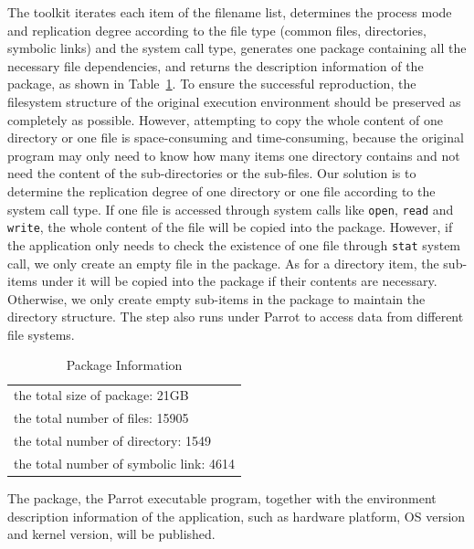 \documentclass{sig-alternate}
\begin{document}
The toolkit iterates each item of the filename list, determines the process
mode and replication degree according to the file type (common files,
directories, symbolic links) and the system call type, generates one package
containing all the necessary file dependencies, and returns the description
information of the package, as shown in Table~\ref{table:package-info}.  To
ensure the successful reproduction, the filesystem structure of the original
execution environment should be preserved as completely as possible. However,
attempting to copy the whole content of one directory or one file is
space-consuming and time-consuming, because the original program may 
only need to know how many items one directory contains and not need the content of the sub-directories or the sub-files.
Our solution is to
determine the replication degree of one directory or one file according to the
system call type. 
If one file is accessed through system calls like {\tt open}, {\tt read} and {\tt write}, the whole content of the file will be copied into the package.
However, if the application only needs to check the existence of one file through {\tt stat} system call, we only create an empty file in the package.
As for a directory item, the sub-items under it will be copied into the package if their contents are necessary. Otherwise, we only create empty sub-items in the package to maintain the directory structure.
The step also runs under Parrot to access data from
different file systems.

\begin{table}
    \centering
    \begin{tabular}{|l|}
    \hline
     the total size of package: 21GB \\ 
    the total number of files: 15905\\ 
    the total number of directory: 1549\\ 
    the total number of symbolic link: 4614 \\ \hline 
    \end{tabular}
    \caption{Package Information}
    \label{table:package-info}
\end{table}

The package, the Parrot executable program, together with the environment description information of the application, such as hardware platform, OS version and kernel version, will be published.
\end{document}
